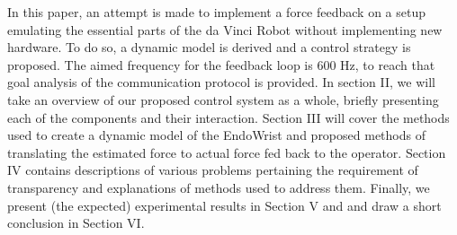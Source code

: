 In this paper, an attempt is made to implement a force feedback on a setup emulating the essential parts of the da Vinci Robot without implementing new hardware. To do so, a dynamic model is derived and a control strategy is proposed. The aimed frequency for the feedback loop is 600 Hz, to reach that goal analysis of the communication protocol is provided. In section II, we will take an overview of our proposed control system as a whole, briefly presenting each of the components and their interaction.
Section III will cover the methods used to create a dynamic model of the EndoWrist and proposed methods of translating the estimated force to actual force fed back to the operator.
Section IV contains descriptions of various problems pertaining the requirement of transparency and explanations of methods used to address them.
Finally,  we present (the expected) experimental results in Section V and and draw a short conclusion in Section VI.







